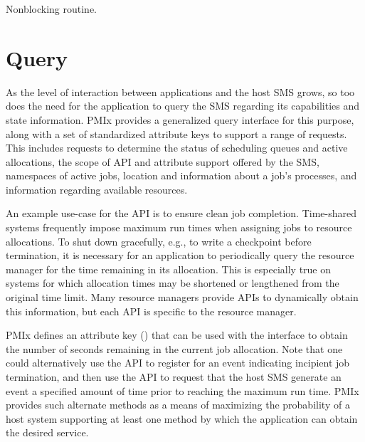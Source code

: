 
\descr

Nonblocking  routine.


\section{Query}
\label{chap:api_proc_mgmt:query}

As the level of interaction between applications and the host \ac{SMS} grows, so too does the need for the application to query the \ac{SMS} regarding its capabilities and state information. \ac{PMIx} provides a generalized query interface for this purpose, along with a set of standardized attribute keys to support a range of requests. This includes requests to determine the status of scheduling queues and active allocations, the scope of \ac{API} and attribute support offered by the \ac{SMS}, namespaces of active jobs, location and information about a job's processes, and information regarding available resources.

An example use-case for the  \ac{API} is to ensure clean job completion. Time-shared systems frequently impose maximum run times when assigning jobs to resource allocations. To shut down gracefully, e.g., to write a checkpoint before termination, it is necessary for an application to periodically query the resource manager for the time remaining in its allocation. This is especially true on systems for which allocation times may be shortened or lengthened from the original time limit. Many resource managers provide \acp{API} to dynamically obtain this information, but each \ac{API} is specific to the resource manager.

\ac{PMIx} defines an attribute key () that can be used with the  interface to obtain the number of seconds remaining in the current job allocation. Note that one could alternatively use the  \ac{API} to register for an event indicating incipient job termination, and then use the  \ac{API} to request that the host \ac{SMS} generate an event a specified amount of time prior to reaching the maximum run time. \ac{PMIx} provides such alternate methods as a means of maximizing the probability of a host system supporting at least one method by which the application can obtain the desired service.

